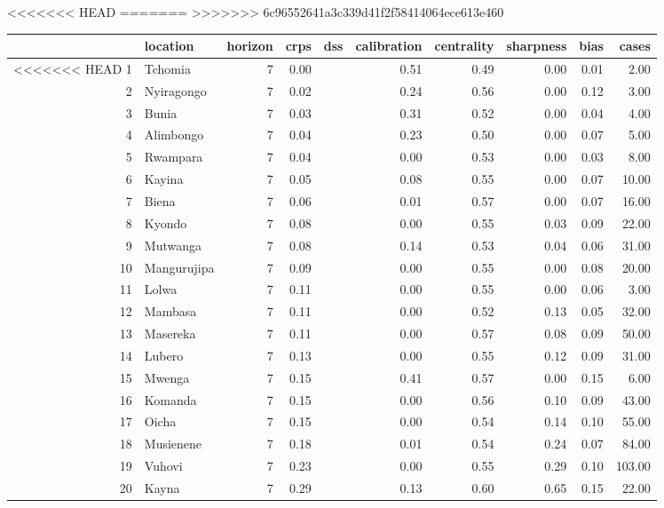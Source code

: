 <<<<<<< HEAD
=======
>>>>>>> 6c96552641a3c339d41f2f58414064ece613e460
\begin{table}[ht]
\centering
\begin{tabular}{rlrrrrrrrr}
  \hline
 & location & horizon & crps & dss & calibration & centrality & sharpness & bias & cases \\ 
  \hline
<<<<<<< HEAD
1 & Tchomia &   7 & 0.00 &  & 0.51 & 0.49 & 0.00 & 0.01 & 2.00 \\ 
  2 & Nyiragongo &   7 & 0.02 &  & 0.24 & 0.56 & 0.00 & 0.12 & 3.00 \\ 
  3 & Bunia &   7 & 0.03 &  & 0.31 & 0.52 & 0.00 & 0.04 & 4.00 \\ 
  4 & Alimbongo &   7 & 0.04 &  & 0.23 & 0.50 & 0.00 & 0.07 & 5.00 \\ 
  5 & Rwampara &   7 & 0.04 &  & 0.00 & 0.53 & 0.00 & 0.03 & 8.00 \\ 
  6 & Kayina &   7 & 0.05 &  & 0.08 & 0.55 & 0.00 & 0.07 & 10.00 \\ 
  7 & Biena &   7 & 0.06 &  & 0.01 & 0.57 & 0.00 & 0.07 & 16.00 \\ 
  8 & Kyondo &   7 & 0.08 &  & 0.00 & 0.55 & 0.03 & 0.09 & 22.00 \\ 
  9 & Mutwanga &   7 & 0.08 &  & 0.14 & 0.53 & 0.04 & 0.06 & 31.00 \\ 
  10 & Mangurujipa &   7 & 0.09 &  & 0.00 & 0.55 & 0.00 & 0.08 & 20.00 \\ 
  11 & Lolwa &   7 & 0.11 &  & 0.00 & 0.55 & 0.00 & 0.06 & 3.00 \\ 
  12 & Mambasa &   7 & 0.11 &  & 0.00 & 0.52 & 0.13 & 0.05 & 32.00 \\ 
  13 & Masereka &   7 & 0.11 &  & 0.00 & 0.57 & 0.08 & 0.09 & 50.00 \\ 
  14 & Lubero &   7 & 0.13 &  & 0.00 & 0.55 & 0.12 & 0.09 & 31.00 \\ 
  15 & Mwenga &   7 & 0.15 &  & 0.41 & 0.57 & 0.00 & 0.15 & 6.00 \\ 
  16 & Komanda &   7 & 0.15 &  & 0.00 & 0.56 & 0.10 & 0.09 & 43.00 \\ 
  17 & Oicha &   7 & 0.15 &  & 0.00 & 0.54 & 0.14 & 0.10 & 55.00 \\ 
  18 & Musienene &   7 & 0.18 &  & 0.01 & 0.54 & 0.24 & 0.07 & 84.00 \\ 
  19 & Vuhovi &   7 & 0.23 &  & 0.00 & 0.55 & 0.29 & 0.10 & 103.00 \\ 
  20 & Kayna &   7 & 0.29 &  & 0.13 & 0.60 & 0.65 & 0.15 & 22.00 \\ 

\end{tabular}
\end{table}
